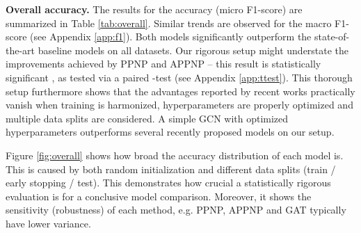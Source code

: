\documentclass{article} \usepackage{iclr2019_conference,times}
\begin{document}
\textbf{Overall accuracy.} The results for the accuracy (micro F1-score) are summarized in Table \ref{tab:overall}. Similar trends are observed for the macro F1-score (see Appendix \ref{app:f1}). Both models significantly outperform the state-of-the-art baseline models on all datasets. Our rigorous setup might understate the improvements achieved by PPNP and APPNP -- this result is statistically significant , as tested via a paired -test (see Appendix \ref{app:ttest}). This thorough setup furthermore shows that the advantages reported by recent works practically vanish when training is harmonized, hyperparameters are properly optimized and multiple data splits are considered. A simple GCN with optimized hyperparameters outperforms several recently proposed models on our setup.

Figure \ref{fig:overall} shows how broad the accuracy distribution of each model is. This is caused by both random initialization and different data splits (train / early stopping / test). This demonstrates how crucial a statistically rigorous evaluation is for a conclusive model comparison. Moreover, it shows the sensitivity (robustness) of each method, e.g. PPNP, APPNP and GAT typically have lower variance.

\begin{table}
    \centering
    \caption{Average training time per epoch. PPNP and APPNP are only slightly slower than GCN and much faster than more sophisticated methods like GAT.}
    \label{tab:runtimes}
\end{table}
\end{document}
